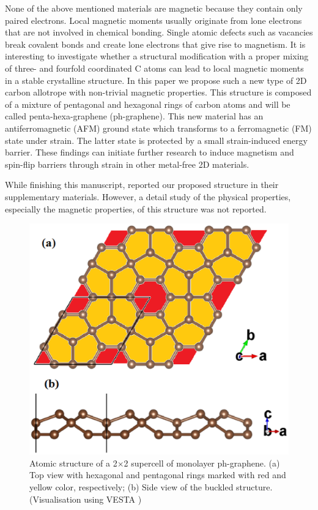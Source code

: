 None of the above mentioned materials are magnetic because they contain only paired electrons. Local magnetic moments usually originate from lone electrons that are not involved in chemical bonding. Single atomic defects such as vacancies break covalent bonds and create lone electrons that give rise to magnetism. It is interesting to investigate whether a structural modification with a proper mixing of three- and fourfold coordinated C atoms can lead to local magnetic moments in a stable crystalline structure.  In this paper we propose such a new type of 2D carbon allotrope with non-trivial magnetic properties. This structure is composed of a mixture of pentagonal and hexagonal rings of carbon atoms and will be called penta-hexa-graphene (ph-graphene). This new material has an antiferromagnetic (AFM) ground state which transforms to a ferromagnetic (FM) state under strain. The latter state is protected by a small strain-induced energy barrier. These findings can initiate further research to induce magnetism and spin-flip barriers through strain in other metal-free 2D materials.

While finishing this manuscript, \citet{Zhang2016} reported our proposed structure in their supplementary materials. However, a detail study of the physical properties, especially the magnetic properties, of this structure was not reported. 

\begin{figure}[htbp]
\centering
\includegraphics[width=0.6\linewidth]{PG_structure.eps}%
\caption{Atomic structure of a 2$\times$2 supercell of monolayer ph-graphene. (a) Top view with hexagonal and pentagonal rings marked with red and yellow color, respectively; (b) Side view of the buckled structure. \label{structure} (Visualisation using VESTA \cite{vesta})}
\end{figure}


